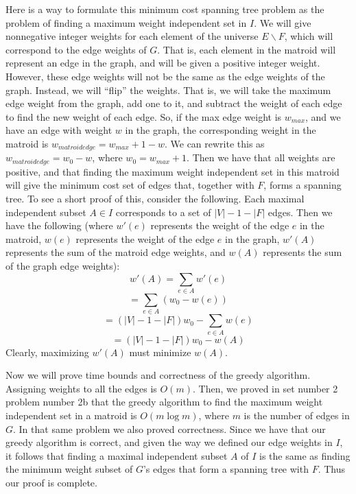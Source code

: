 \documentclass{article}
\begin{document}
\begin{description}
         Here is a way to formulate this minimum cost spanning tree problem as the
        problem of finding a maximum weight independent set in $I$. We will
        give nonnegative integer
        weights for each element of the universe $E \backslash F$, which will correspond to the
        edge weights of $G$. That is, each element in the matroid will
        represent an edge in the graph, and will be given a positive integer weight.
        However, these edge weights will not be the
        same as the edge weights of the graph. Instead, we will ``flip'' the
        weights. That is, we will take the maximum edge weight from the graph,
        add one to it,
        and subtract the weight of each edge to find the new weight of each
        edge. So, if the max edge weight is $w_{max}$, and we have an edge with
        weight $w$ in the graph, the corresponding weight in the matroid is $w_{matroid edge} =
        w_{max} + 1 - w$. We can rewrite this as $w_{matroid edge} = w_0 - w$, where
        $w_0 = w_{max} + 1$.
        Then we have that all weights are positive,
        and that finding the maximum weight independent set in this
        matroid will give the minimum cost set of edges that, together with $F$,
        forms a spanning tree.
        To see a short proof of this, consider the
        following. Each maximal independent subset $A \in I$ corresponds to a set of
        $|V| - 1 - |F|$ edges. Then we have the following (where $w'(e)$
        represents the weight of the edge $e$ in the matroid, $w(e)$ represents the
        weight of the edge $e$ in the graph, $w'(A)$ represents the sum of the
        matroid edge weights, and $w(A)$ represents the sum of the graph edge
        weights):
        \[ w'(A) = \sum_{e \in A} w'(e) \]
        \[ = \sum_{e \in A} (w_0 - w(e)) \]
        \[ = (|V| - 1 - |F|)w_0 - \sum_{e \in A} w(e) \]
        \[ = (|V| - 1 - |F|)w_0 - w(A) \]
        Clearly, maximizing $w'(A)$ must minimize $w(A)$.

        Now we will prove time bounds and correctness of the greedy algorithm.
        Assigning weights to all the edges is $O(m)$. Then, we proved in set
        number 2 problem number 2b that the greedy algorithm to find the maximum weight
        independent set in a matroid is $O(m \log m)$, where $m$ is the number
        of edges in $G$. In that same problem we also proved correctness. Since
        we have that our greedy algorithm is correct, and given the way we
        defined our edge weights in $I$, it follows that finding a
        maximal independent subset $A$ of $I$ is the same as finding the minimum
        weight subset of $G$'s edges that form a spanning tree with $F$.
        Thus our proof is complete.
\end{description}
\newpage
\end{document}
